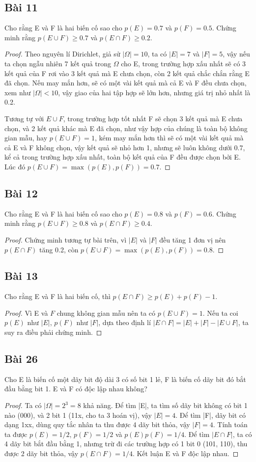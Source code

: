 \subsection*{Bài 11}
Cho rằng E và F là hai biến cố sao cho $p(E)=0.7$ và $p(F)=0.5$. Chứng minh rằng $p(E\cup F)\geq0.7$ và $p(E\cap F)\geq0.2$.
\begin{proof}
    \par Theo nguyên lí Dirichlet, giả sử $|\Omega|=10$, ta có $|E|=7$ và $|F|=5$, vậy nếu ta chọn ngẫu nhiên 7 kết quả trong $\Omega$ cho E, trong trường hợp xấu nhất sẽ có 3 kết quả của F rơi vào 3 kết quả mà E chưa chọn, còn 2 kết quả chắc chắn rằng E đã chọn. Nếu may mắn hơn, sẽ có một vài kết quả mà cả E và F đều chưa chọn, xem như $|\Omega|<10$, vậy giao của hai tập hợp sẽ lớn hơn, nhưng giá trị nhỏ nhất là 0.2.
    \par Tương tự với $E\cup F$, trong trường hợp tốt nhất F sẽ chọn 3 kết quả mà E chưa chọn, và 2 kết quả khác mà E đã chọn, như vậy hợp của chúng là toàn bộ không gian mẫu, hay $p(E\cup F)=1$, kém may mắn hơn thì sẽ có một vài kết quả mà cả E và F không chọn, vậy kết quả sẽ nhỏ hơn 1, nhưng sẽ luôn không dưới 0.7, kể cả trong trường hợp xấu nhất, toàn bộ kết quả của F đều được chọn bởi E. Lúc đó $p(E\cup F)=\max(p(E),p(F))=0.7$.
\end{proof}
\subsection*{Bài 12}
Cho rằng E và F là hai biến cố sao cho $p(E)=0.8$ và $p(F)=0.6$. Chứng minh rằng $p(E\cup F)\geq0.8$ và $p(E\cap F)\geq0.4$.
\begin{proof}
    Chứng minh tương tự bài trên, vì $|E|$ và $|F|$ đều tăng 1 đơn vị nên $p(E\cap F)$ tăng 0.2, còn $p(E\cup F)=\max(p(E),p(F))=0.8$.
\end{proof}
\subsection*{Bài 13}
Cho rằng E và F là hai biến cố, thì $p(E\cap F)\geq p(E)+p(F)-1$.
\begin{proof}
    Vì E và $F$ chung không gian mẫu nên ta có $p(E\cup F)=1$. Nếu ta coi $p(E)$ như $|E|$, $p(F)$ như $|F|$, dựa theo định lí $|E\cap F|=|E|+|F|-|E\cup F|$, ta suy ra điều phải chứng minh.
\end{proof}
\subsection*{Bài 26}
Cho E là biến cố một dãy bit độ dài 3 có số bit 1 lẻ, F là biến cố dãy bit đó bắt đầu bằng bit 1. E và F có độc lập nhau không?
\begin{proof}
    Ta có $|\Omega|=2^3=8$ khả năng.
    Để tìm |E|, ta tìm số dãy bit không có bit 1 nào (000), và 2 bit 1 (11x, cho ta 3 hoán vị), vậy $|E|=4$.
    Để tìm |F|, dãy bit có dạng 1xx, dùng quy tắc nhân ta thu được 4 dãy bit thỏa, vậy $|F|=4$.
    Tính toán ta được $p(E)=1/2$, $p(F)=1/2$ và $p(E)p(F)=1/4$.
    Để tìm $|E\cap F|$, ta có 4 dãy bit bắt đầu bằng 1, nhưng trừ đi các trường hợp có 1 bit 0 (101, 110), thu được 2 dãy bit thỏa, vậy $p(E\cap F)=1/4$. Kết luận E và F độc lập nhau.
\end{proof}
